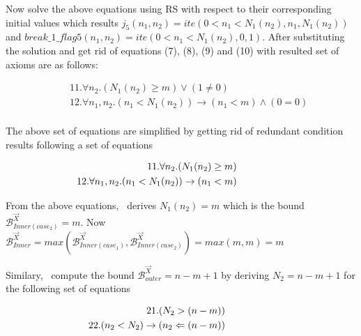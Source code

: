 Now solve the above equations using RS  with respect to their corresponding initial values which results $j_5(n_1,n_2)=ite(0<n_1< N_1(n_2),n_1,N_1(n_2))$ and $break\_1\_flag5(n_1,n_2)=ite(0<n_1< N_1(n_2),0,1)$. After substituting the solution and get rid of equations (7), (8), (9) and (10) with resulted set of axioms are as follows:

\begin{eqnarray*}
	&&11.\forall n_2.(N_1(n_2)\geq m) \lor (1\not=0) \\
	&&12.\forall n_1,n_2.(n_1<N_1(n_2)) \rightarrow (n_1<m) \land (0=0)\\
\end{eqnarray*}

The above set of equations are simplified by getting rid of redundant condition results following a set of equations

\begin{eqnarray*}
	&&\hspace*{-6em}11.\forall n_2.(N_1(n_2)\geq m)  \\
	&&\hspace*{-6em}12.\forall n_1,n_2.(n_1<N_1(n_2)) \rightarrow (n_1<m)\\
\end{eqnarray*}

From the above equations, \SystemName\ derives $N_1(n_2)=m$ which is the bound $\mathcal{B}^{\vec{X}}_{Inner(case_2)}=m$. Now $\mathcal{B}^{\vec{X}}_{Inner}=max(\mathcal{B}^{\vec{X}}_{Inner(case_1)},\mathcal{B}^{\vec{X}}_{Inner(case_2)})=max(m,m)=m$





Similary, \SystemName\ compute the bound $\mathcal{B}^{\vec{X}}_{outer}=n-m+1$ by deriving $N_2=n-m+1$ for the following set of equations

\begin{eqnarray*}
	&&\hspace*{-6em}21.(N_2>(n-m)) \\
	&&\hspace*{-6em}22.(n_2<N_2) \rightarrow (n_2<=(n-m)) 
\end{eqnarray*}









